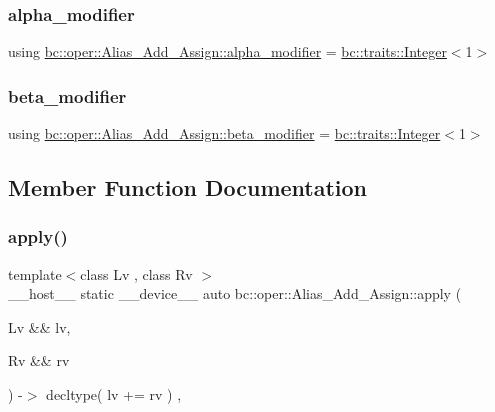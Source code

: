 \subsubsection{\texorpdfstring{alpha\+\_\+modifier}{alpha\_modifier}}
{\footnotesize\ttfamily using \hyperlink{structbc_1_1oper_1_1Alias__Add__Assign_a7a509d5fb7acf8ab6d89dd07c7cdb833}{bc\+::oper\+::\+Alias\+\_\+\+Add\+\_\+\+Assign\+::alpha\+\_\+modifier} =  \hyperlink{structbc_1_1traits_1_1Integer}{bc\+::traits\+::\+Integer}$<$1$>$}

\mbox{\label{structbc_1_1oper_1_1Alias__Add__Assign_a5eb213fdd8f2e901e50e86157b438c69}} 
\subsubsection{\texorpdfstring{beta\+\_\+modifier}{beta\_modifier}}
{\footnotesize\ttfamily using \hyperlink{structbc_1_1oper_1_1Alias__Add__Assign_a5eb213fdd8f2e901e50e86157b438c69}{bc\+::oper\+::\+Alias\+\_\+\+Add\+\_\+\+Assign\+::beta\+\_\+modifier} =  \hyperlink{structbc_1_1traits_1_1Integer}{bc\+::traits\+::\+Integer}$<$1$>$}



\subsection{Member Function Documentation}
\mbox{\label{structbc_1_1oper_1_1Alias__Add__Assign_ada0a058271a4a854408a2eb86c1bb2e1}} 
\subsubsection{\texorpdfstring{apply()}{apply()}}
{\footnotesize\ttfamily template$<$class Lv , class Rv $>$ \\
\+\_\+\+\_\+host\+\_\+\+\_\+ static \+\_\+\+\_\+device\+\_\+\+\_\+ auto bc\+::oper\+::\+Alias\+\_\+\+Add\+\_\+\+Assign\+::apply (\begin{DoxyParamCaption}\item[{Lv \&\&}]{lv,  }\item[{Rv \&\&}]{rv }\end{DoxyParamCaption}) -\/$>$ decltype( lv += rv ) \hspace{0.3cm}{\ttfamily [inline]}, {\ttfamily [static]}}

